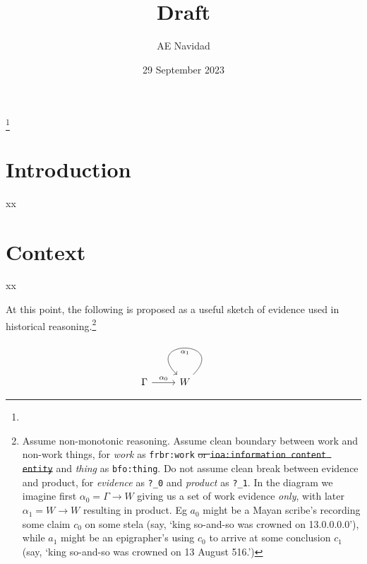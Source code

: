 \documentclass{amsart}%
\newcommand{\code}[1]{\texttt{#1}}%
\newcommand{\mention}[1]{\textit{#1}}%
\theoremstyle{plain}
\theoremstyle{definition}
\theoremstyle{remark}
\theoremstyle{definition}
\theoremstyle{remark}
\begin{document}
%
%
%
\title{Draft}
\author{AE Navidad}
\address{Harvard College, Cambridge, MA}%
{}
\date{29 September 2023}
\thanks{\lipsum[1][1]}%
\begin{abstract}
\lipsum[1][1-6]
\end{abstract}
\keywords{\lipsum[1][1]}
\maketitle
%
%
%
%
%
\section{Introduction}
\label{s:intro}
xx
%
%
%
%

%
%
%
%
%
\section{Context}
\label{s:cont}
xx

At this point, the following is proposed as a useful sketch of evidence used in historical reasoning.\footnote{Assume non-monotonic reasoning. Assume clean boundary between work and non-work things, for \mention{work} as \code{frbr:work} \sout{or \code{ioa:information content entity}} and \mention{thing} as \code{bfo:thing}. Do not assume clean break between evidence and product, for \mention{evidence} as \code{?\_0} and \mention{product} as \code{?\_1}. In the diagram we imagine first \(\alpha_0=\Gamma\to W\) giving us a set of work evidence \emph{only}, with later \(\alpha_1=W\to W\) resulting in product. Eg \(a_0\) might be a Mayan scribe's recording some claim \(c_0\) on some stela (say, `king so-and-so was crowned on 13.0.0.0.0'), while \(a_1\) might be an epigrapher's using \(c_0\) to arrive at some conclusion \(c_1\) (say, `king so-and-so was crowned on 13 August 516.')}%
\[
\begin{tikzcd}
\Gamma \ar[r,"\alpha_0"] & W\ar[loop,"\alpha_1"] %
\end{tikzcd}
\]
\end{document}
